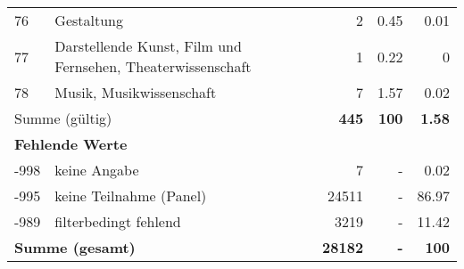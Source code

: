 \begin{longtable}{lXrrr}
        76 & \multicolumn{1}{X}{Gestaltung} & %
          \num{2} &
          \num[round-mode=places,round-precision=2]{0.45} &
          \num[round-mode=places,round-precision=2]{0.01} \\

        77 & \multicolumn{1}{X}{Darstellende Kunst, Film und Fernsehen, Theaterwissenschaft} & %
          \num{1} &
          \num[round-mode=places,round-precision=2]{0.22} &
          \num[round-mode=places,round-precision=2]{0} \\

        78 & \multicolumn{1}{X}{Musik, Musikwissenschaft} & %
          \num{7} &
          \num[round-mode=places,round-precision=2]{1.57} &
          \num[round-mode=places,round-precision=2]{0.02} \\

     \midrule
     \multicolumn{2}{l}{Summe (gültig)} &
       \textbf{\num{445}} &
     \textbf{\num{100}} &
       \textbf{\num[round-mode=places,round-precision=2]{1.58}} \\
     \multicolumn{5}{l}{\textbf{Fehlende Werte}}\\
       -998 &
       keine Angabe &
         \num{7} &
        - &
         \num[round-mode=places,round-precision=2]{0.02} \\
       -995 &
       keine Teilnahme (Panel) &
         \num{24511} &
        - &
         \num[round-mode=places,round-precision=2]{86.97} \\
       -989 &
       filterbedingt fehlend &
         \num{3219} &
        - &
         \num[round-mode=places,round-precision=2]{11.42} \\
     \midrule
     \multicolumn{2}{l}{\textbf{Summe (gesamt)}} &
          \textbf{\num{28182}} &
        \textbf{-} &
        \textbf{\num{100}} \\
     \bottomrule
     \end{longtable}
     
